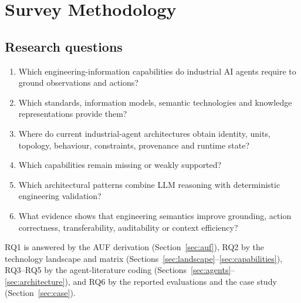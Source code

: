 \section{Survey Methodology}
\label{sec:method}

\subsection{Research questions}
\begin{enumerate}[label=\textbf{RQ\arabic*.},leftmargin=2.6em]
  \item Which engineering-information capabilities do industrial AI agents require to
  ground observations and actions?
  \item Which standards, information models, semantic technologies and knowledge
  representations provide them?
  \item Where do current industrial-agent architectures obtain identity, units, topology,
  behaviour, constraints, provenance and runtime state?
  \item Which capabilities remain missing or weakly supported?
  \item Which architectural patterns combine LLM reasoning with deterministic engineering
  validation?
  \item What evidence shows that engineering semantics improve grounding, action
  correctness, transferability, auditability or context efficiency?
\end{enumerate}
RQ1 is answered by the AUF derivation (Section~\ref{sec:auf}), RQ2 by the technology
landscape and matrix (Sections~\ref{sec:landscape}--\ref{sec:capabilities}), RQ3--RQ5 by
the agent-literature coding (Sections~\ref{sec:agents}--\ref{sec:architecture}), and RQ6
by the reported evaluations and the case study (Section~\ref{sec:case}).

